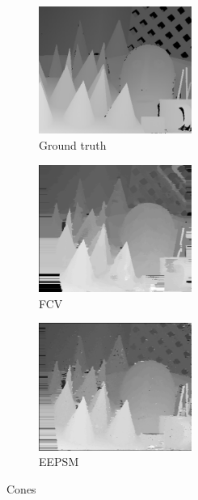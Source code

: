 \begin{figure}[ht]
  \centering
  \begin{subfigure}[t]{0.3\textwidth}
    \centering\includegraphics[width=5cm]{figures/con_gt}
    \caption{Ground truth \cite{Scharstein2003}\label{fig:con_gt}}
  \end{subfigure}\hspace{0.5cm}
  \begin{subfigure}[t]{0.3\textwidth}
    \centering\includegraphics[width=5cm]{figures/con_fcv}
    \caption{FCV\label{fig:con_fcv}}
  \end{subfigure}\hspace{0.5cm}
  \begin{subfigure}[t]{0.3\textwidth}
    \centering\includegraphics[width=5cm]{figures/con_eepsm1}
    \caption{EEPSM\label{fig:con_eepsm}}
  \end{subfigure}
  \caption{Cones \cite{Scharstein2003} \label{fig:conall}}
\end{figure}

